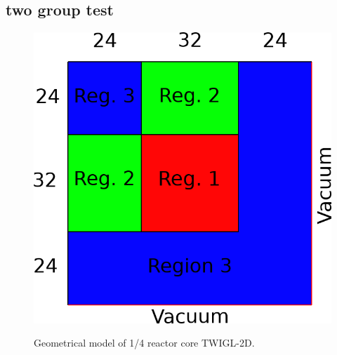 \documentclass[authoryear]{elsarticle}
\begin{document}
\subsection{two group test}
%

\begin{figure}[ht]
\begin{center}
	\includegraphics[width=0.5\linewidth]{twigl.png} \\
	\caption{\label{image:canonsummary}Geometrical model of 1/4 reactor core TWIGL-2D.}
	\label{ris:twigl}
\end{center}
\end{figure}
\end{document}
